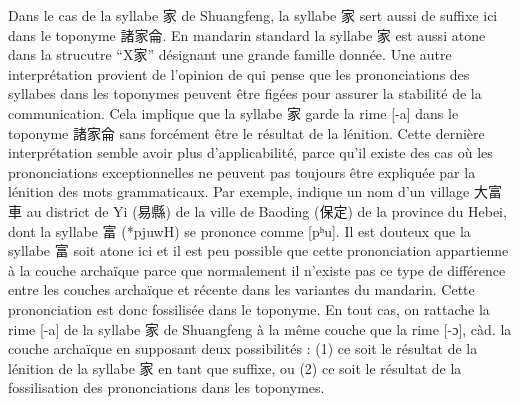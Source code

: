 \documentclass{scrbook}
\newcounter{c}[subsubsection]
\newcommand{\difwenbai}{couches archaïque et récente\xspace}
\begin{document}
\begin{sloppypar}
Dans le cas de la syllabe 家 de Shuangfeng, la syllabe 家 sert aussi de suffixe ici dans le toponyme 諸家侖. En mandarin standard la syllabe 家 est aussi atone dans la strucutre ``X家'' désignant une grande famille donnée. Une autre interprétation provient de l'opinion de \textcite{Li1985diming} qui pense que les prononciations des syllabes dans les toponymes peuvent être figées pour assurer la stabilité de la communication. Cela implique que la syllabe 家 garde la rime [-a] dans le toponyme 諸家侖 sans forcément être le résultat de la lénition. Cette dernière interprétation semble avoir plus d'applicabilité, parce qu'il existe des cas où les prononciations exceptionnelles ne peuvent pas toujours être expliquée par la lénition des mots grammaticaux. Par exemple, \textcite[36--37]{Wang2017diming_yixian} indique un nom d'un village 大富車 au district de Yi (易縣) de la ville de Baoding (保定) de la province du Hebei, dont la syllabe 富 (*pjuwH) se prononce comme [pʰu]. Il est douteux que la syllabe 富 soit atone ici et il est peu possible que cette prononciation appartienne à la couche archaïque parce que normalement il n'existe pas ce type de différence entre les \difwenbai dans les variantes du mandarin. Cette prononciation est donc fossilisée dans le toponyme. En tout cas, on rattache la rime [-a] de la syllabe 家 de Shuangfeng à la même couche que la rime [-ɔ], càd. la couche archaïque en supposant deux possibilités : (1) ce soit le résultat de la lénition de la syllabe 家 en tant que suffixe, ou (2) ce soit le résultat de la fossilisation des prononciations dans les toponymes.




\end{sloppypar}
\end{document}
